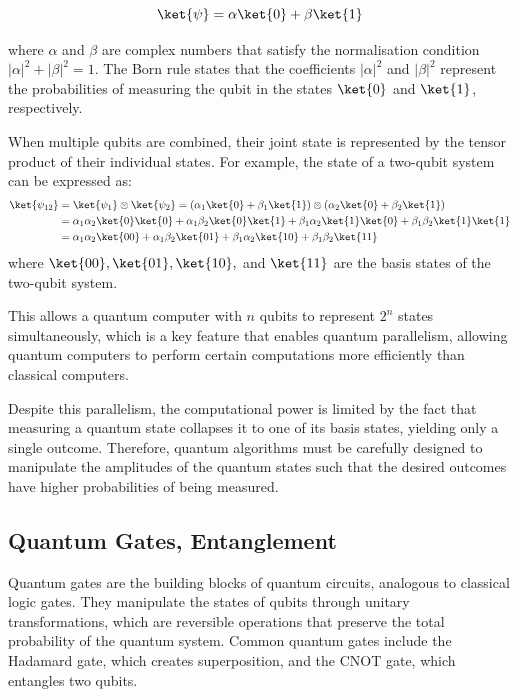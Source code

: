 $$\ket{\psi} = \alpha\ket{0} + \beta\ket{1}$$

where $\alpha$ and $\beta$ are complex numbers that satisfy the normalisation condition $|\alpha|^2 + |\beta|^2 = 1$. The Born rule states that the coefficients $|\alpha|^2$  and $|\beta|^2$ represent the probabilities of measuring the qubit in the states $\ket{0}$ and $\ket{1}$, respectively.

When multiple qubits are combined, their joint state is represented by the tensor product of their individual states. For example, the state of a two-qubit system can be expressed as:
\begin{align*}
\ket{\psi_{12}} &= \ket{\psi_1} \otimes \ket{\psi_2} = (\alpha_1\ket{0} + \beta_1\ket{1}) \otimes (\alpha_2\ket{0} + \beta_2\ket{1})\\
&=\alpha_1\alpha_2\ket{0}\ket{0} + \alpha_1\beta_2\ket{0}\ket{1} + \beta_1\alpha_2\ket{1}\ket{0} + \beta_1\beta_2\ket{1}\ket{1}\\
&= \alpha_1\alpha_2\ket{00} + \alpha_1\beta_2\ket{01} + \beta_1\alpha_2\ket{10} + \beta_1\beta_2\ket{11}
\end{align*}
where $\ket{00}, \ket{01}, \ket{10},$ and $\ket{11}$ are the basis states of the two-qubit system.

This allows a quantum computer with $n$ qubits to represent $2^n$ states simultaneously, which is a key feature that enables quantum parallelism, allowing quantum computers to perform certain computations more efficiently than classical computers.

Despite this parallelism, the computational power is limited by the fact that measuring a quantum state collapses it to one of its basis states, yielding only a single outcome. Therefore, quantum algorithms must be carefully designed to manipulate the amplitudes of the quantum states such that the desired outcomes have higher probabilities of being measured.

\subsection{Quantum Gates, Entanglement}

Quantum gates are the building blocks of quantum circuits, analogous to classical logic gates. They manipulate the states of qubits through unitary transformations, which are reversible operations that preserve the total probability of the quantum system. Common quantum gates include the Hadamard gate, which creates superposition, and the CNOT gate, which entangles two qubits. 

